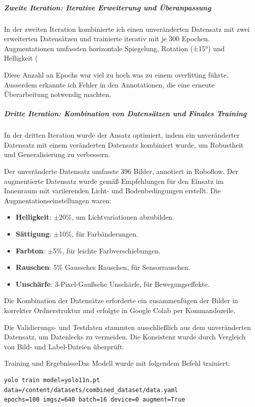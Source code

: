 \subparagraph{Zweite Iteration: Iterative Erweiterung und Überanpassung}

In der zweiten Iteration kombinierte ich einen unveränderten Datensatz mit zwei erweiterten Datensätzen und trainierte iterativ mit je 300 Epochen.
Augmentationen umfassten horizontale Spiegelung, Rotation (±15°) und Helligkeit (

Diese Anzahl an Epochs war viel zu hoch was zu einem overfitting führte. Ausserdem erkannte ich Fehler in den Annotationen, die eine erneute Überarbeitung notwendig machten.

\subparagraph{Dritte Iteration: Kombination von Datensätzen und Finales Training}

In der dritten Iteration wurde der Ansatz optimiert, indem ein unveränderter Datensatz mit einem veränderten Datensatz kombiniert wurde, um Robustheit und Generalisierung zu verbessern.

Der unveränderte Datensatz umfasste 396 Bilder, annotiert in Roboflow. Der augmentierte Datensatz wurde gemäß Empfehlungen für den Einsatz im Innenraum mit variierenden Licht- und Bodenbedingungen erstellt. Die Augmentationseinstellungen waren:

\begin{itemize} 
    \item \textbf{Helligkeit}: $\pm$20\%, um Lichtvariationen abzubilden. 
    \item \textbf{Sättigung}: $\pm$10\%, für Farbänderungen. 
    \item \textbf{Farbton}: $\pm$5\%, für leichte Farbverschiebungen. 
    \item \textbf{Rauschen}: 5\% Gaussches Rauschen, für Sensorrauschen. 
    \item \textbf{Unschärfe}: 3-Pixel-Gaußsche Unschärfe, für Bewegungseffekte. 
\end{itemize}
Die Kombination der Datensätze erforderte ein zusammenfügen der Bilder in korrekter Ordnerstruktur und erfolgte in Google Colab per Kommandozeile.

Die Validierungs- und Testdaten stammten ausschließlich aus dem unveränderten Datensatz, um Datenlecks zu vermeiden. Die Konsistenz wurde durch Vergleich von Bild- und Label-Dateien überprüft.

Training und ErgebnisseDas Modell wurde mit folgendem Befehl trainiert:


\begin{verbatim}
yolo train model=yolo11n.pt data=/content/datasets/combined_dataset/data.yaml 
epochs=100 imgsz=640 batch=16 device=0 augment=True
\end{verbatim}


